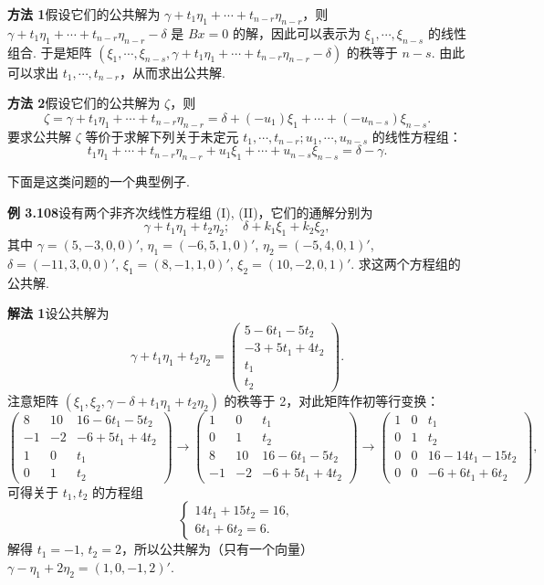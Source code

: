 \documentclass[UTF8,12pt,a4paper,fontset=fandol]{ctexart}
\begin{document}
\noindent\textbf{方法 1}\quad 假设它们的公共解为 $\gamma+t_1\eta_1+\cdots+t_{n-r}\eta_{n-r}$，则 $\gamma+t_1\eta_1+\cdots+t_{n-r}\eta_{n-r}-\delta$ 是 $Bx=0$ 的解，因此可以表示为 $\xi_1,\cdots,\xi_{n-s}$ 的线性组合. 于是矩阵 $(\xi_1,\cdots,\xi_{n-s},\gamma+t_1\eta_1+\cdots+t_{n-r}\eta_{n-r}-\delta)$ 的秩等于 $n-s$. 由此可以求出 $t_1,\cdots,t_{n-r}$，从而求出公共解.

\noindent\textbf{方法 2}\quad 假设它们的公共解为 $\zeta$，则
\[
\zeta=\gamma+t_1\eta_1+\cdots+t_{n-r}\eta_{n-r}
=\delta+(-u_1)\xi_1+\cdots+(-u_{n-s})\xi_{n-s}.
\]
要求公共解 $\zeta$ 等价于求解下列关于未定元 $t_1,\cdots,t_{n-r};u_1,\cdots,u_{n-s}$ 的线性方程组：
\[
t_1\eta_1+\cdots+t_{n-r}\eta_{n-r}+u_1\xi_1+\cdots+u_{n-s}\xi_{n-s}=\delta-\gamma.
\]

下面是这类问题的一个典型例子.

\noindent\textbf{例 3.108}\quad 设有两个非齐次线性方程组 (I), (II)，它们的通解分别为
\[
\gamma+t_1\eta_1+t_2\eta_2;\quad \delta+k_1\xi_1+k_2\xi_2,
\]
其中 $\gamma=(5,-3,0,0)'$, $\eta_1=(-6,5,1,0)'$, $\eta_2=(-5,4,0,1)'$, $\delta=(-11,3,0,0)'$, $\xi_1=(8,-1,1,0)'$, $\xi_2=(10,-2,0,1)'.$ 求这两个方程组的公共解.

\noindent\textbf{解法 1}\quad 设公共解为
\[
\gamma+t_1\eta_1+t_2\eta_2=
\begin{pmatrix}
5-6t_1-5t_2\\
-3+5t_1+4t_2\\
t_1\\
t_2
\end{pmatrix}.
\]
注意矩阵 $(\xi_1,\xi_2,\gamma-\delta+t_1\eta_1+t_2\eta_2)$ 的秩等于 2，对此矩阵作初等行变换：
\[
\begin{pmatrix}
8&10&16-6t_1-5t_2\\
-1&-2&-6+5t_1+4t_2\\
1&0&t_1\\
0&1&t_2
\end{pmatrix}
\to
\begin{pmatrix}
1&0&t_1\\
0&1&t_2\\
8&10&16-6t_1-5t_2\\
-1&-2&-6+5t_1+4t_2
\end{pmatrix}
\to
\begin{pmatrix}
1&0&t_1\\
0&1&t_2\\
0&0&16-14t_1-15t_2\\
0&0&-6+6t_1+6t_2
\end{pmatrix},
\]
可得关于 $t_1,t_2$ 的方程组
\[
\begin{cases}
14t_1+15t_2=16,\\
6t_1+6t_2=6.
\end{cases}
\]
解得 $t_1=-1$, $t_2=2$，所以公共解为（只有一个向量）$\gamma-\eta_1+2\eta_2=(1,0,-1,2)'$.
\end{document}
